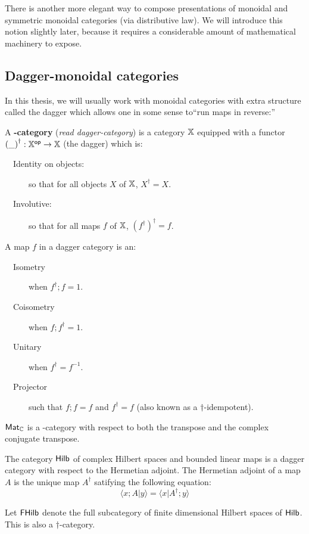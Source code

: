 There is another  more elegant way to compose presentations of monoidal and symmetric monoidal categories (via distributive law).  We will introduce this notion slightly later, because it requires a considerable amount of mathematical machinery to expose.


\subsection{Dagger-monoidal categories}
In this thesis, we will usually work with monoidal categories with extra structure called the dagger which allows one in some sense to``run maps in reverse:''


\begin{definition}
A {\bf \dag-category} ({\em read dagger-category}) is a category $\mathbb{X}$ equipped with a functor ${(\_)}^\dag:\mathbb{X}^{\mathsf{op}}\to\mathbb{X}$ (the dagger) which is:

\begin{description}
\item[\ \ Identity on objects:] so that for all objects $X$ of $\mathbb{X}$, $X^\dag = X$.
\item[\ \ Involutive:] so that for all maps $f$ of $\mathbb{X}$, $(f^\dag)^\dag = f$.
\end{description}

A map $f$ in a dagger category is an:

\begin{description}
\item[\ \ Isometry] when $f^\dag; f = 1$.
\item[\ \ Coisometry] when $f; f^\dag = 1$.
\item[\ \ Unitary] when $f^\dag = f^{-1}$.
\item[\ \ Projector] such that $f;f=f$ and $f^\dag=f$ (also known as a $\dag$-idempotent).
\end{description}

\end{definition}


\begin{example}
 $\mathsf{Mat}_{\mathbb{C}}$ is a \dag-category with respect to both the transpose and the complex conjugate transpose.
\end{example}

\begin{example}

The category $\mathsf{Hilb}$ of complex Hilbert spaces and bounded linear maps is a dagger category with respect to the Hermetian adjoint.  The Hermetian adjoint of a map $A$ is the unique map $A^\dag$ satifying the following equation:
$$
\langle x;A|y\rangle = \langle x | A^\dag; y \rangle
$$


Let $\mathsf{FHilb}$ denote the full subcategory of finite dimensional Hilbert spaces of $\mathsf{Hilb}$.  This is also a $\dag$-category.
\end{example}

